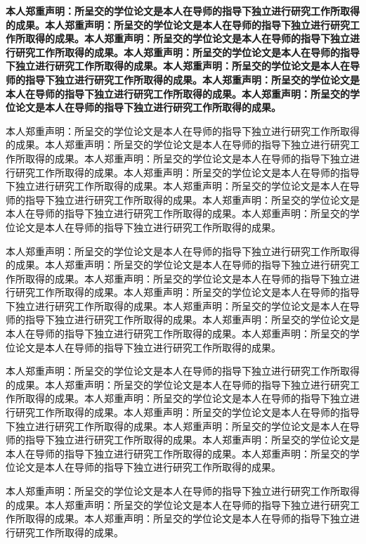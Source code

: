 \documentclass[class = professional, twoside, AutoFakeBold=3.17,AutoFakeSlant=0.2]{gdufe_master_thesis}
\begin{document}
{\bfseries 本人郑重声明：所呈交的学位论文是本人在导师的指导下独立进行研究工作所取得的成果。本人郑重声明：所呈交的学位论文是本人在导师的指导下独立进行研究工作所取得的成果。本人郑重声明：所呈交的学位论文是本人在导师的指导下独立进行研究工作所取得的成果。本人郑重声明：所呈交的学位论文是本人在导师的指导下独立进行研究工作所取得的成果。本人郑重声明：所呈交的学位论文是本人在导师的指导下独立进行研究工作所取得的成果。本人郑重声明：所呈交的学位论文是本人在导师的指导下独立进行研究工作所取得的成果。本人郑重声明：所呈交的学位论文是本人在导师的指导下独立进行研究工作所取得的成果。
\the\baselineskip}

{本人郑重声明：所呈交的学位论文是本人在导师的指导下独立进行研究工作所取得的成果。本人郑重声明：所呈交的学位论文是本人在导师的指导下独立进行研究工作所取得的成果。本人郑重声明：所呈交的学位论文是本人在导师的指导下独立进行研究工作所取得的成果。本人郑重声明：所呈交的学位论文是本人在导师的指导下独立进行研究工作所取得的成果。本人郑重声明：所呈交的学位论文是本人在导师的指导下独立进行研究工作所取得的成果。本人郑重声明：所呈交的学位论文是本人在导师的指导下独立进行研究工作所取得的成果。本人郑重声明：所呈交的学位论文是本人在导师的指导下独立进行研究工作所取得的成果。
\the\baselineskip}

本人郑重声明：所呈交的学位论文是本人在导师的指导下独立进行研究工作所取得的成果。本人郑重声明：所呈交的学位论文是本人在导师的指导下独立进行研究工作所取得的成果。本人郑重声明：所呈交的学位论文是本人在导师的指导下独立进行研究工作所取得的成果。本人郑重声明：所呈交的学位论文是本人在导师的指导下独立进行研究工作所取得的成果。本人郑重声明：所呈交的学位论文是本人在导师的指导下独立进行研究工作所取得的成果。本人郑重声明：所呈交的学位论文是本人在导师的指导下独立进行研究工作所取得的成果。本人郑重声明：所呈交的学位论文是本人在导师的指导下独立进行研究工作所取得的成果。
\the\baselineskip

本人郑重声明：所呈交的学位论文是本人在导师的指导下独立进行研究工作所取得的成果。本人郑重声明：所呈交的学位论文是本人在导师的指导下独立进行研究工作所取得的成果。本人郑重声明：所呈交的学位论文是本人在导师的指导下独立进行研究工作所取得的成果。本人郑重声明：所呈交的学位论文是本人在导师的指导下独立进行研究工作所取得的成果。本人郑重声明：所呈交的学位论文是本人在导师的指导下独立进行研究工作所取得的成果。本人郑重声明：所呈交的学位论文是本人在导师的指导下独立进行研究工作所取得的成果。本人郑重声明：所呈交的学位论文是本人在导师的指导下独立进行研究工作所取得的成果。

本人郑重声明：所呈交的学位论文是本人在导师的指导下独立进行研究工作所取得的成果。本人郑重声明：所呈交的学位论文是本人在导师的指导下独立进行研究工作所取得的成果。本人郑重声明：所呈交的学位论文是本人在导师的指导下独立进行研究工作所取得的成果。
\end{document}
